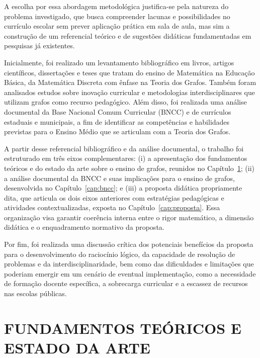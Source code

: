 \documentclass[
  12pt,
  oneside,
  a4paper,
  english,
  brazilian
  ]{abntex2}
\theoremstyle{definition}
\begin{document}
A escolha por essa abordagem metodológica justifica-se pela natureza do problema
investigado, que busca compreender lacunas e possibilidades no currículo escolar
sem prever aplicação prática em sala de aula, mas sim a construção de um
referencial teórico e de sugestões didáticas fundamentadas em pesquisas já
existentes.

Inicialmente, foi realizado um levantamento bibliográfico em livros, artigos
científicos, dissertações e teses que tratam do ensino de Matemática na Educação
Básica, da Matemática Discreta com ênfase na Teoria dos Grafos. Também foram
analisados estudos sobre inovação curricular e metodologias interdisciplinares
que utilizam grafos como recurso pedagógico. Além disso, foi realizada uma análise documental da Base Nacional Comum
Curricular (BNCC) e de currículos estaduais e municipais, a fim de identificar as
competências e habilidades previstas para o Ensino Médio que se articulam com a
Teoria dos Grafos.

A partir desse referencial bibliográfico e da análise documental, o trabalho
foi estruturado em três eixos complementares: (i) a apresentação dos
fundamentos teóricos e do estado da arte sobre o ensino de grafos,
reunidos no Capítulo~\ref{cap:fundamentos}; (ii) a análise documental da BNCC
e suas implicações para o ensino de grafos, desenvolvida no
Capítulo~\ref{cap:bncc}; e (iii) a proposta didática propriamente dita, que
articula os dois eixos anteriores com estratégias pedagógicas e atividades
contextualizadas, exposta no Capítulo~\ref{cap:proposta}. Essa organização visa
garantir coerência interna entre o rigor matemático, a dimensão didática e o
enquadramento normativo da proposta.

Por fim, foi realizada uma discussão crítica dos potenciais benefícios da proposta
para o desenvolvimento do raciocínio lógico, da capacidade de resolução de
problemas e da interdisciplinaridade, bem como das dificuldades e limitações que
poderiam emergir em um cenário de eventual implementação, como a necessidade de
formação docente específica, a sobrecarga curricular e a escassez de recursos nas
escolas públicas.

\chapter{FUNDAMENTOS TEÓRICOS E ESTADO DA ARTE}
\label{cap:fundamentos}
\end{document}
